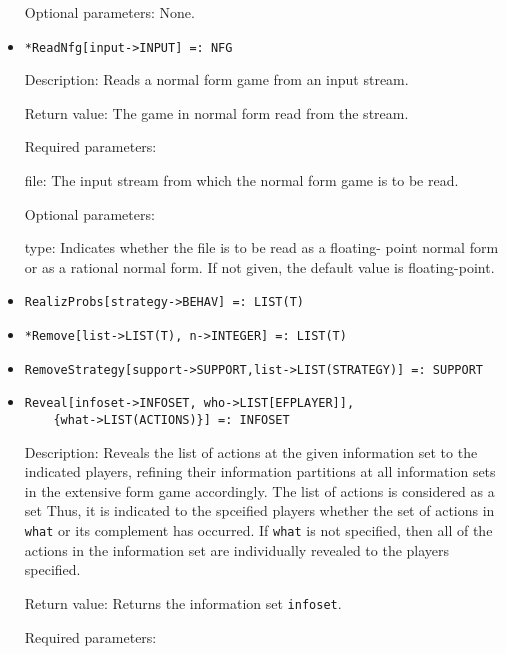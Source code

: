 \begin{itemize}
\item
[Optional parameters:] None.\hfil\null
\ed

\item
\protect \large \begin{verbatim}
*ReadNfg[input->INPUT] =: NFG
\end{verbatim}\normalsize
\bd
\item
[Description:] Reads a normal form game from an input stream.  
\item
[Return value:] The game in normal form read from the stream.
\item
[Required parameters:]\hfil\null

\bd
\item
[file:] The input stream from which the normal form game is to be
read.  
\ed

\item
[Optional parameters:]\hfil\null
\bd

\item
[type:] Indicates whether the file is to be read as a floating- point
normal form or as a rational normal form.  If not given, the default
value is floating-point.
\ed
\ed

\item
\protect \large \begin{verbatim}
RealizProbs[strategy->BEHAV] =: LIST(T)
\end{verbatim}\normalsize

\item
\protect \large \begin{verbatim}
*Remove[list->LIST(T), n->INTEGER] =: LIST(T)
\end{verbatim}\normalsize

\item
\protect \large \begin{verbatim}
RemoveStrategy[support->SUPPORT,list->LIST(STRATEGY)] =: SUPPORT
\end{verbatim}\normalsize

\item
\protect \large \begin{verbatim}
Reveal[infoset->INFOSET, who->LIST[EFPLAYER]], 
	{what->LIST(ACTIONS)}] =: INFOSET
\end{verbatim}\normalsize

\bd
\item
[Description:] Reveals the list of actions at the given information
set to the indicated players, refining their information partitions at
all information sets in the extensive form game accordingly.  The list
of actions is considered as a set Thus, it is indicated to the
spceified players whether the set of actions in \verb+what+ or its
complement has occurred.  If \verb+what+ is not specified, then all of
the actions in the information set are individually revealed to
the players specified.  
\item
[Return value:] Returns the information set \verb+infoset+.
\item
[Required parameters:]\hfil\null
	

\end{itemize}
